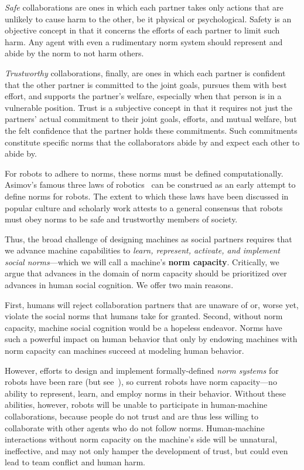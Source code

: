 
{\em Safe\/} collaborations are ones in which each partner takes only
actions that are unlikely to cause harm to the other, be it physical
or psychological.  Safety is an objective concept in that it concerns
the efforts of each partner to limit such harm.  Any agent with even a
rudimentary norm system should represent and abide by the norm to not
harm others.

{\em Trustworthy\/} collaborations, finally, are ones in which each
partner is confident that the other partner is committed to the joint
goals, pursues them with best effort, and supports the partner's
welfare, especially when that person is in a vulnerable position.
Trust is a subjective concept in that it requires not just the
partners' actual commitment to their joint goals, efforts, and mutual
welfare, but the felt confidence that the partner holds these
commitments.  Such commitments constitute specific norms that the
collaborators abide by and expect each other to abide by.

For robots to adhere to norms, these norms must be defined
computationally.  Asimov's famous three laws of
robotics~\cite{asimov_1950} can be construed as an early attempt to
define norms for robots. The extent to which these laws have been
discussed in popular culture and scholarly work attests to a general
consensus that robots must obey norms to be safe and trustworthy
members of society.

Thus, the broad challenge of designing machines as social partners
requires that we advance machine capabilities to {\em learn,
  represent, activate, and implement social norms}---which we will
call a machine's {\bf norm capacity}.  Critically, we argue that
advances in the domain of norm capacity should be prioritized over
advances in human social cognition.  We offer two main reasons.

First, humans will reject collaboration partners that are unaware of
or, worse yet, violate the social norms that humans take for granted.
Second, without norm capacity, machine social cognition would be a
hopeless endeavor.  Norms have such a powerful impact on human
behavior that only by endowing machines with norm capacity can
machines succeed at modeling human behavior.

However, efforts to design and implement formally-defined \emph{norm
  systems\/} for robots have been rare (but
see~\cite{arkin09,scheutz_roman_2015}), so current robots have norm
capacity---no ability to represent, learn, and employ norms in their
behavior.  Without these abilities, however, robots will be unable to
participate in human-machine collaborations, because people do not
trust  and are thus less willing to
collaborate with other agents who do not follow norms.  Human-machine
interactions without norm capacity on the machine's side will be
unnatural, ineffective, and may not only hamper the development of
trust, but could even lead to team conflict and human harm.

